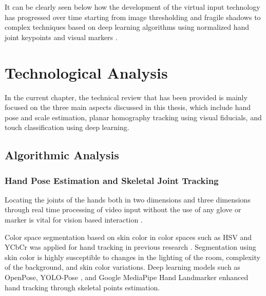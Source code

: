 It can be clearly seen below how the development of the virtual input technology has progressed over time starting from image thresholding \cite{Zhang2001Visual, Srivastava2012RealTime} and fragile shadows \cite{Thomas2013Camera, Posner2012Single} to complex techniques based on deep learning algorithms using normalized hand joint keypoints \cite{Zhang2020MediaPipe, GilMartin2023Hand, Maman2023TypeNet} and visual markers \cite{Wang2016AprilTag2, GarridoJurado2026ArUco}.

\section{Technological Analysis}
\label{sec:lit_technological_analysis}
In the current chapter, the technical review that has been provided is mainly focused on the three main aspects discussed in this thesis, which include hand pose and scale estimation, planar homography tracking using visual fiducials, and touch classification using deep learning.

\subsection{Algorithmic Analysis}
\label{subsec:lit_algorithmic_analysis}

\subsubsection{Hand Pose Estimation and Skeletal Joint Tracking}
Locating the joints of the hands both in two dimensions and three dimensions through real time processing of video input without the use of any glove or marker is vital for vision based interaction \cite{Cui2020Deep, Zhang2020MediaPipe}.

Color space segmentation based on skin color in color spaces such as HSV and YCbCr was applied for hand tracking in previous research \cite{Ji2018Local, Khare2019QWERTY}. Segmentation using skin color is highly susceptible to changes in the lighting of the room, complexity of the background, and skin color variations. Deep learning models such as OpenPose, YOLO-Pose \cite{Andriyanov2025Improving}, and Google MediaPipe Hand Landmarker \cite{Zhang2020MediaPipe} enhanced hand tracking through skeletal points estimation.

